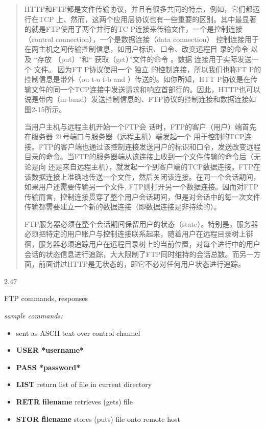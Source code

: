 \documentclass[
]{article}
\begin{document}
\begin{quote}
HTTP和FTP都是文件传输协议，并且有很多共同的特点，例如，它们都运行在TCP
上、然而，这两个应用层协议也有一些重要的区别。其中最显著的就是FTP使用了两个并行的TC
P连接来传输文件，一个是控制连接（control
connection），一个是数据连接（data connection）
控制连接用于在两主机之间传输控制信息，如用户标识、口令、改变远程目
录的命令 以及 ``存放 （put）"和`` 获取（get）''文件的命令 。数据
连接用于实际发送一个 文件。 因为FT P协议使用一个 独立
的控制连接，所以我们也称FT P的控制信息是带外（ou t-o f-b and
）传送的。如你所知，HTT
P协议是在传输文件的同一个TCP连接中发送请求和响应首部行的。因此，HTTP也可以说是带内（in-band）发送控制信息的、FTP协议的控制连接和数据连接如图2-15所示。

当用户主机与远程主机开始一个FTP会 话时，FTP的客户（用户）端首先在服务器
21号端口与服务器（远程主机）端发起一个
用于控制的TCP连接。FTP的客户端也通过该控制连接发送用户的标识和口令，发送改变远程目录的命令。当FTP的服务器端从该连接上收到一个文件传输的命令后（无论是向
还是来自远程主机），就发起一个到客户端的TCP数据连接。FTP在该数据连接上准确地传送一个文件，然后关闭该连接。在同一个会话期间，如果用户还需要传输另一个文件,
FTP则打开另一个数据连接。因而对FTP传输而言，控制连接贯穿了整个用户会话期间，但是对会话中的每一次文件传输都需要建立一个新的数据连接（即数据连接是非持续的）。

FTP服务器必须在整个会话期间保留用户的状态（state）。特别是，服务器必须把特定的用户账户与控制连接联系起来，随着用户在远程目录树上徘徊，服务器必须追踪用户在远程目录树上的当前位置，对每个进行中的用户会话的状态信息进行追踪，大大限制了FTP同时维持的会话总数。而另一方面，前面讲过HTTP是无状态的，即它不必对任何用户状态进行追踪。
\end{quote}

2.47

FTP commands, responses

\emph{sample commands:}

\begin{itemize}
\item
  sent as ASCII text over control channel
\item
  \textbf{USER *username*}
\item
  \textbf{PASS *password*}
\item
  \textbf{LIST} return list of file in current directory
\item
  \textbf{RETR filename} retrieves (gets) file
\item
  \textbf{STOR filename} stores (puts) file onto remote host
\end{itemize}
\end{document}
